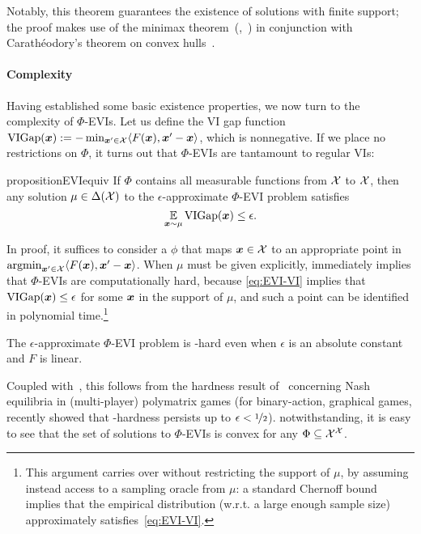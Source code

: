 Notably, this theorem guarantees the existence of solutions with finite support; the proof makes use of the minimax theorem~(\eg,~\citealp{Sion58:On}) in conjunction with Carath\'eodory's theorem on convex hulls~\cite{Caratheodory11:Uber}.

\paragraph{Complexity} Having established some basic existence properties, we now turn to the complexity of $\Phi$-EVIs. Let us define the VI gap function $\mathrm{VIGap}({\bm{x}}) := - \min_{{\bm{x}}' \in {\mathcal{X}}} \langle F({\bm{x}}), {\bm{x}}' - {\bm{x}} \rangle$, which is nonnegative. If we place no restrictions on $\Phi$, it turns out that $\Phi$-EVIs are tantamount to regular VIs:


\begin{restatable}{proposition}{EVIequiv}
    \label{prop:EVI-VI}
    If $\Phi$ contains all measurable functions from ${\mathcal{X}}$ to ${\mathcal{X}}$, then any solution $\mu \in \Delta({\mathcal{X}})$ to the $\epsilon$-approximate $\Phi$-EVI problem satisfies
    \begin{equation}
        \label{eq:EVI-VI}
        \operatorname*{\mathbb E}_{{\bm{x}} \sim \mu} \mathrm{VIGap}({\bm{x}}) \leq \epsilon. 
    \end{equation}
\end{restatable}

In proof, it suffices to consider a $\phi$ that maps ${\bm{x}} \in {\mathcal{X}}$ to an appropriate point in $\operatorname*{argmin}_{{\bm{x}}' \in {\mathcal{X}}} \langle F({\bm{x}}), {\bm{x}}' - {\bm{x}} \rangle$. When $\mu$ must be given explicitly,  immediately implies that $\Phi$-EVIs are computationally hard, because \eqref{eq:EVI-VI} implies that $\mathrm{VIGap}({\bm{x}}) \leq \epsilon$ for some ${\bm{x}}$ in the support of $\mu$, and such a point can be identified in polynomial time.\footnote{This argument carries over without restricting the support of $\mu$, by assuming instead access to a sampling oracle from $\mu$: a standard Chernoff bound implies that the empirical distribution (w.r.t. a large enough sample size) approximately satisfies~\eqref{eq:EVI-VI}.}

\begin{corollary}
    \label{cor:hard-EVI}
    The $\epsilon$-approximate $\Phi$-EVI problem is \PPAD-hard even when $\epsilon$ is an absolute constant and $F$ is linear.
\end{corollary}

Coupled with~, this follows from the hardness result of~\citet{Rubinstein15:Inapproximability} concerning Nash equilibria in (multi-player) polymatrix games (for binary-action, graphical games, \citealp{Deligkas23:Tight} recently showed that \PPAD-hardness persists up to $\epsilon < \nicefrac{1}{2}$).  notwithstanding, it is easy to see that the set of solutions to $\Phi$-EVIs is convex for any $\Phi \subseteq {\mathcal{X}}^{\mathcal{X}}$.

